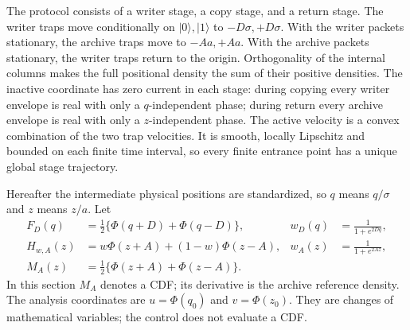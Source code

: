 \documentclass[11pt]{article}
\numberwithin{equation}{section}
\theoremstyle{definition}
\theoremstyle{remark}
\begin{document}
The protocol consists of a writer stage, a copy stage, and a return
stage. The writer traps move conditionally on $|0\rangle,|1\rangle$ to
$-D\sigma,+D\sigma$. With the writer packets stationary, the archive
traps move to $-Aa,+Aa$. With the archive packets stationary, the writer
traps return to the origin. Orthogonality of the internal columns makes
the full positional density the sum of their positive densities.
The inactive coordinate has zero current in each stage: during copying
every writer envelope is real with only a $q$-independent phase; during
return every archive envelope is real with only a $z$-independent phase.
The active velocity is a convex combination of the two trap velocities.
It is smooth, locally Lipschitz and bounded on each finite time interval,
so every finite entrance point has a unique global stage trajectory.

Hereafter the intermediate physical positions are standardized, so $q$
means $q/\sigma$ and $z$ means $z/a$. Let
\begin{align}
 F_D(q)&=\tfrac12\{\Phi(q+D)+\Phi(q-D)\},&
 w_D(q)&=\frac{1}{1+e^{2Dq}},\label{p1p:eq:cdfs}\\
 H_{w,A}(z)&=w\Phi(z+A)+(1-w)\Phi(z-A),&
 w_A(z)&=\frac{1}{1+e^{2Az}},\nonumber\\
 M_A(z)&=\tfrac12\{\Phi(z+A)+\Phi(z-A)\}.&&\nonumber
\end{align}
In this section $M_A$ denotes a CDF; its derivative is the archive
reference density. The analysis coordinates are $u=\Phi(q_0)$ and
$v=\Phi(z_0)$. They are changes of mathematical variables; the control
does not evaluate a CDF.
\end{document}
